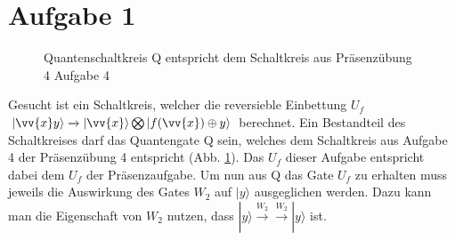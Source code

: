 \documentclass[a4paper]{scrartcl}
\begin{document}
\section*{Aufgabe 1}
\begin{figure}[htp] 
\caption{Quantenschaltkreis Q entspricht dem Schaltkreis aus Präsenzübung 4 Aufgabe 4}
\label{p4a4}
\end{figure}
Gesucht ist ein Schaltkreis, welcher die reversieble Einbettung $U_f$ $|\vv{x}y\rangle \xrightarrow{} |\vv{x}\rangle \bigotimes |f(\vv{x}) \oplus y \rangle$ berechnet.
Ein Bestandteil des Schaltkreises darf das Quantengate Q sein, welches dem Schaltkreis aus Aufgabe 4 der Präsenzübung 4 entspricht (Abb. \ref{p4a4}).
Das $U_f$ dieser Aufgabe entspricht dabei dem $U_f$ der Präsenzaufgabe.
Um nun aus Q das Gate $U_f$ zu erhalten muss jeweils die Auswirkung des Gates $W_2$ auf $|y\rangle$ ausgeglichen werden. Dazu kann man die Eigenschaft von $W_2$ nutzen, dass $|y\rangle \xrightarrow{W_2} \xrightarrow{W_2} |y\rangle$ ist.
\end{document}
